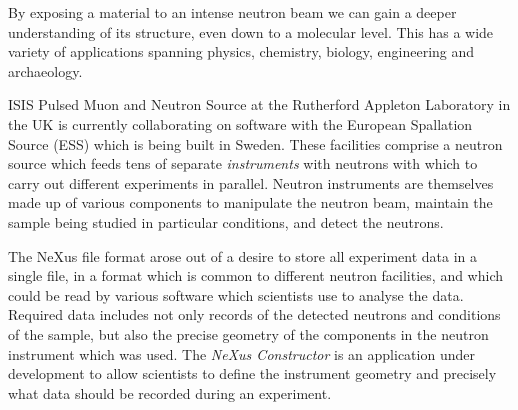 By exposing a material to an intense neutron beam we can gain a deeper understanding of its structure, even down to a molecular level. This has a wide variety of applications spanning physics, chemistry, biology, engineering and archaeology.

ISIS Pulsed Muon and Neutron Source at the Rutherford Appleton Laboratory in the UK is currently collaborating on software with the European Spallation Source (ESS) which is being built in Sweden. These facilities comprise a neutron source which feeds tens of separate \textit{instruments} with neutrons with which to carry out different experiments in parallel. Neutron instruments are themselves made up of various components to manipulate the neutron beam, maintain the sample being studied in particular conditions, and detect the neutrons.

The NeXus file format arose out of a desire to store all experiment data in a single file, in a format which is common to different neutron facilities, and which could be read by various software which scientists use to analyse the data. Required data includes not only records of the detected neutrons and conditions of the sample, but also the precise geometry of the components in the neutron instrument which was used. The \textit{NeXus Constructor} is an application under development to allow scientists to define the instrument geometry and precisely what data should be recorded during an experiment.
